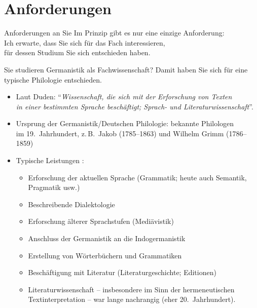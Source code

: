 \section{Anforderungen}

\begin{frame}
  {Anforderungen an Sie}
  \onslide<+->
  \onslide<+->
  \centering 
  Im Prinzip gibt es nur eine einzige Anforderung:\\
  \onslide<+->
  \Doppelzeile
  \alert{\Large Ich erwarte, dass Sie sich für das Fach interessieren,\\
    \Viertelzeile
  für dessen Studium Sie sich entschieden haben.}
\end{frame}

\begin{frame}
  {Sie studieren Germanistik als Fachwissenschaft?}
  \onslide<+->
  \onslide<+->
  Damit haben Sie sich für eine typische \alert{Philologie} entschieden.\\
  \Zeile
  \begin{itemize}[<+->]
    \item Laut Duden: \alert{"`\textit{Wissenschaft, die sich mit der Erforschung von Texten\\
      in einer bestimmten Sprache beschäftigt; Sprach- und Literaturwissenschaft}"'}.
      \Halbzeile
    \item Ursprung der Germanistik\slash Deutschen Philologie: bekannte Philologen\\
      im 19.~Jahrhundert, z.\,B.\ Jakob (1785--1863) und Wilhelm Grimm (1786--1859)
    \Halbzeile
  \item Typische Leistungen :
      \begin{itemize}[<+->]
        \item Erforschung der aktuellen Sprache (Grammatik; heute auch Semantik, Pragmatik usw.)
        \item Beschreibende Dialektologie
        \item Erforschung älterer Sprachstufen (Mediävistik)
        \item Anschluss der Germanistik an die Indogermanistik
        \item Erstellung von Wörterbüchern und Grammatiken
        \item Beschäftigung mit Literatur (Literaturgeschichte; Editionen)
        \item Literaturwissenschaft -- insbesondere im Sinn der hermeneutischen \\
          Textinterpretation -- war lange nachrangig (eher 20.~Jahrhundert).
      \end{itemize}
  \end{itemize}
\end{frame}


